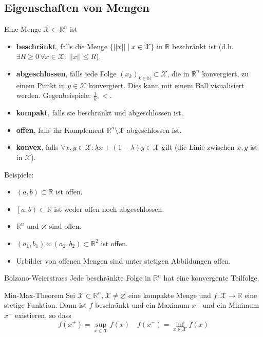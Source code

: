 \documentclass[a4paper,10pt]{article}
\def\R{\mathbb{R}}
\def\N{\mathbb{N}}
\def\X{\mathcal{X}}
\begin{document}
\subsection{Eigenschaften von Mengen}
Eine Menge \(\X \subset \R^n \) ist
\begin{itemize}
  \item \textbf{beschränkt}, falls die Menge \(\{ ||x|| \mid x \in \X \}\) in \(\R\) beschränkt ist (d.h. \(\exists R \ge 0\, \forall x \in \X:\: ||x|| \le R\)).
  \item \textbf{abgeschlossen}, falls jede Folge \((x_k)_{k\in \N} \subset \X\), die in \(\R^n\) konvergiert, zu einem Punkt in \(y \in \X\) konvergiert. Dies kann mit einem Ball visualisiert werden. Gegenbeispiele: \(\frac{1}{k}, <\).
  \item \textbf{kompakt}, falls sie beschränkt und abgeschlossen ist.
  \item \textbf{offen}, falls ihr Komplement \(\R^n \setminus \X\) abgeschlossen ist.
  \item \textbf{konvex}, falls \(\forall x, y \in \X: \lambda x + (1 - \lambda)y \in \X\) gilt (die Linie zwischen \(x, y\) ist in \(\X\)).
\end{itemize}
Beispiele:
\begin{itemize}
  \item \((a,b) \subset \R\) ist offen.
  \item \(\left[a,b\right) \subset \R\) ist weder offen noch abgeschlossen.
  \item \(\R^n\) und \(\varnothing\) sind offen.
  \item \((a_1, b_1) \times (a_2,b_2) \subset \R^2\) ist offen.
  \item Urbilder von offenen Mengen sind unter stetigen Abbildungen offen.
\end{itemize}
\begin{subbox}{Bolzano-Weierstrass}
  Jede beschränkte Folge in \(\R^n\) hat eine konvergente Teilfolge.
\end{subbox}
\begin{subbox}{Min-Max-Theorem}
  Sei \(\X \subset \R^n, \X \ne \varnothing\) eine kompakte Menge und \(f: \X \to \R\) eine stetige Funktion. Dann ist \(f\) beschränkt und ein Maximum \(x^+\) und ein Minimum \(x^-\) existieren, so dass
  \[f(x^+) = \sup_{x\in \X} f(x) \quad f(x^-) = \inf_{x \in \X} f(x)\]
\end{subbox}
\end{document}
